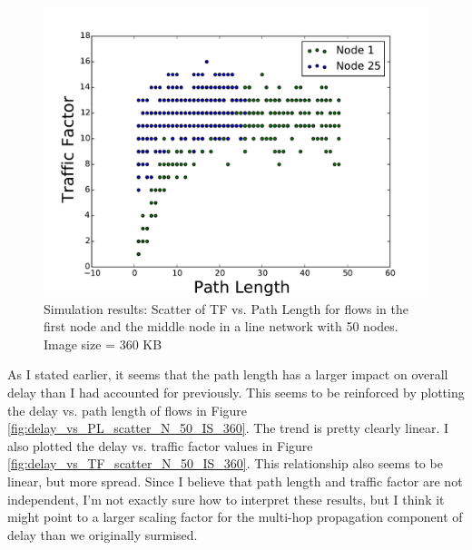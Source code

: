 \documentclass[conference]{IEEEtran}
\begin{document}
\begin{figure}
\begin{centering}
    \includegraphics[scale=0.4, clip=true, trim=0mm 0mm 0mm 0mm]{figs_exp_vs_anal/num_nodes_50/image_size_360/timeliness_165/line_net/PL_vs_TF_scatter.pdf}
    \caption{ Simulation results: Scatter of TF vs. Path Length for flows in the first node and the middle node in a line network with 50 nodes.  Image size = 360 KB}
    \label{fig:pl_vs_tf_scatter_N_50_IS_360}
\end{centering}
\end{figure}

As I stated earlier, it seems that the path length has a larger impact on overall delay than I had accounted for previously.  This seems to be reinforced by plotting the delay vs. path length of flows in Figure \ref{fig:delay_vs_PL_scatter_N_50_IS_360}.  The trend is pretty clearly linear.  I also plotted the delay vs. traffic factor values in Figure \ref{fig:delay_vs_TF_scatter_N_50_IS_360}.  This relationship also seems to be linear, but more spread.  Since I believe that path length and traffic factor are not independent, I'm not exactly sure how to interpret these results, but I think it might point to a larger scaling factor for the multi-hop propagation component of delay than we originally surmised.  
\end{document}

